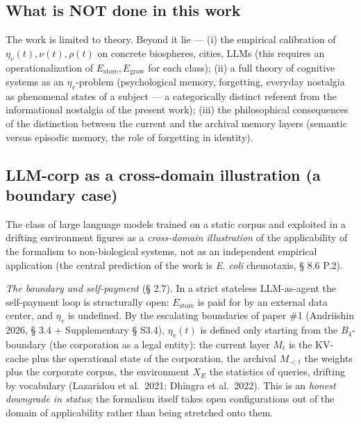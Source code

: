 \documentclass[pdflatex,sn-mathphys-ay]{sn-jnl}
\providecommand{\lt}{<}\providecommand{\gt}{>}
\begin{document}
\subsection{What is NOT done in this work}\label{what-is-not-done-in-this-work}



The work is limited to theory. Beyond it lie --- (i) the empirical calibration of \(\eta_v(t), \nu(t), \rho(t)\) on concrete biospheres, cities, LLMs (this requires an operationalization of \(E_{\text{store}}, E_{\text{grow}}\) for each class); (ii) a full theory of cognitive systems as an \(\eta_v\)-problem (psychological memory, forgetting, everyday nostalgia as phenomenal states of a subject --- a categorically distinct referent from the informational nostalgia of the present work); (iii) the philosophical consequences of the distinction between the current and the archival memory layers (semantic versus episodic memory, the role of forgetting in identity).



\subsection{LLM-corp as a cross-domain illustration (a boundary case)}\label{llm-corp-as-a-cross-domain-illustration-a-boundary-case}



The class of large language models trained on a static corpus and exploited in a drifting environment figures as a \emph{cross-domain illustration} of the applicability of the formalism to non-biological systems, not as an independent empirical application (the central prediction of the work is \emph{E. coli} chemotaxis, § 8.6 P.2).



\emph{The boundary and self-payment} (§ 2.7). In a strict stateless LLM-as-agent the self-payment loop is structurally open: \(\dot E_{\text{store}}\) is paid for by an external data center, and \(\eta_v\) is undefined. By the escalating boundaries of paper \#1 (Andriishin 2026, § 3.4 + Supplementary § S3.4), \(\eta_v(t)\) is defined only starting from the \(B_4\)-boundary (the corporation as a legal entity): the current layer \(M_t\) is the KV-cache plus the operational state of the corporation, the archival \(M_{\lt t}\) the weights plus the corporate corpus, the environment \(X_E\) the statistics of queries, drifting by vocabulary (Lazaridou et al.~2021; Dhingra et al.~2022). This is an \emph{honest downgrade in status}: the formalism itself takes open configurations out of the domain of applicability rather than being stretched onto them.
\end{document}

